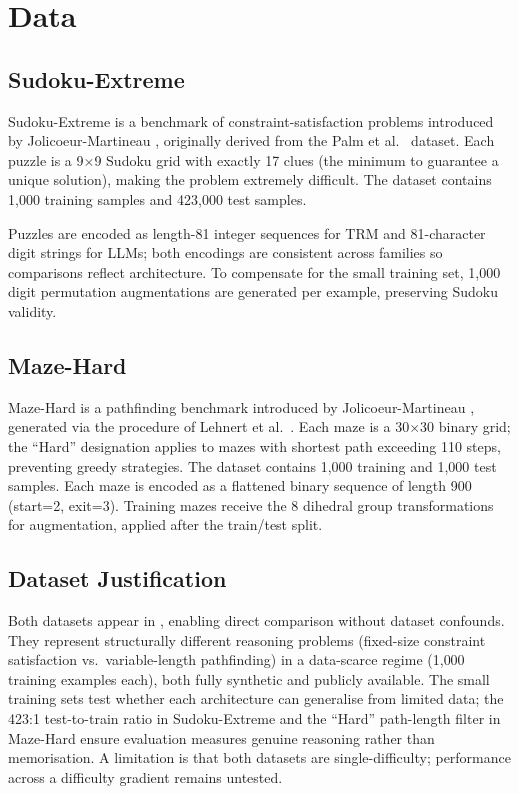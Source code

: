 \documentclass{article}
\begin{document}

\section{Data}

\subsection{Sudoku-Extreme}

Sudoku-Extreme is a benchmark of constraint-satisfaction problems introduced by Jolicoeur-Martineau , originally derived from the Palm et al.\  dataset. Each puzzle is a 9$\times$9 Sudoku grid with exactly 17 clues (the minimum to guarantee a unique solution), making the problem extremely difficult. The dataset contains 1{,}000 training samples and 423{,}000 test samples.

Puzzles are encoded as length-81 integer sequences for TRM and 81-character digit strings for LLMs; both encodings are consistent across families so comparisons reflect architecture. To compensate for the small training set, 1{,}000 digit permutation augmentations are generated per example, preserving Sudoku validity.

\subsection{Maze-Hard}

Maze-Hard is a pathfinding benchmark introduced by Jolicoeur-Martineau , generated via the procedure of Lehnert et al.\ . Each maze is a 30$\times$30 binary grid; the ``Hard'' designation applies to mazes with shortest path exceeding 110 steps, preventing greedy strategies. The dataset contains 1{,}000 training and 1{,}000 test samples. Each maze is encoded as a flattened binary sequence of length 900 (start=2, exit=3). Training mazes receive the 8 dihedral group transformations for augmentation, applied after the train/test split.

\subsection{Dataset Justification}

Both datasets appear in \cite{JolicoeurMartineau2025,Dillon2026}, enabling direct comparison without dataset confounds. They represent structurally different reasoning problems (fixed-size constraint satisfaction vs.\ variable-length pathfinding) in a data-scarce regime (1{,}000 training examples each), both fully synthetic and publicly available. The small training sets test whether each architecture can generalise from limited data; the 423:1 test-to-train ratio in Sudoku-Extreme and the ``Hard'' path-length filter in Maze-Hard ensure evaluation measures genuine reasoning rather than memorisation. A limitation is that both datasets are single-difficulty; performance across a difficulty gradient remains untested.
\end{document}
